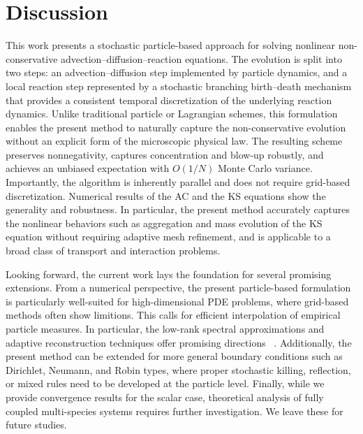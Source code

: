 \documentclass[a4paper,fleqn]{cas-sc}
\theoremstyle{definition}
\theoremstyle{remark}
\begin{document}
\section{Discussion}
This work presents a stochastic particle-based approach for solving nonlinear non-conservative advection–diffusion–reaction equations. 
The evolution is split into two steps: an advection–diffusion step implemented by particle dynamics, and a local reaction step represented by a stochastic branching birth–death mechanism that provides a consistent temporal discretization of the underlying reaction dynamics. 
Unlike traditional particle or Lagrangian schemes, this formulation enables the present method to naturally capture the non-conservative evolution without an explicit form of the microscopic physical law. The resulting scheme preserves nonnegativity, captures concentration and blow-up robustly, and achieves an unbiased expectation with $O(1/N)$ Monte Carlo variance. Importantly, the algorithm is inherently parallel and does not require grid-based discretization.
%
Numerical results of the AC and the KS equations show the generality and robustness. In particular, the present method accurately captures the nonlinear behaviors such as aggregation and mass evolution of the KS equation without requiring adaptive mesh refinement, and is applicable to a broad class of transport and interaction problems. 

Looking forward, the current work lays the foundation for several promising extensions. From a numerical perspective, the present particle-based formulation is particularly well-suited for high-dimensional PDE problems, where grid-based methods often show limitions. This calls for efficient interpolation of empirical particle measures. In particular, the low-rank spectral approximations and adaptive reconstruction techniques offer promising directions ~\cite{tang2025solving, Peng_Yang_tensor_arxiv_2024}. Additionally, the present method can be extended for more general boundary conditions such as Dirichlet, Neumann, and Robin types, where proper stochastic killing, reflection, or mixed rules need to be developed at the particle level. Finally, while we provide convergence results for the scalar case, theoretical analysis of fully coupled multi-species systems requires further investigation. We leave these for future studies. 

\end{document}
